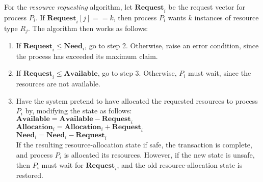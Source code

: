 For the \textit{resource requesting} algorithm, let $\mathbf{Request}_i$ be the request vector for process $P_i$.
If $\mathbf{Request}_i [j] == k$, then process $P_i$ wants $k$ instances of resource type $R_j$.
The algorithm then works as follows:
\begin{enumerate}
    \item If $\mathbf{Request}_i \le \mathbf{Need}_i$, go to step 2.
    Otherwise, raise an error condition, since the process has exceeded its maximum claim.
    \item If $\mathbf{Request}_i \le \mathbf{Available}$, go to step 3.
    Otherwise, $P_i$ must wait, since the resources are not available.
    \item Have the system pretend to have allocated the requested resources to process $P_i$ by,
    modifying the state as follows:\\
    $\mathbf{Available} = \mathbf{Available} - \mathbf{Request}_i$\\
    $\mathbf{Allocation}_i = \mathbf{Allocation}_i + \mathbf{Request}_i$\\
    $\mathbf{Need}_i = \mathbf{Need}_i - \mathbf{Request}_i$\\
    If the resulting resource-allocation state if safe,
    the transaction is complete, and process $P_i$ is allocated its resources.
    However, if the new state is unsafe, then $P_i$ must wait for $\mathbf{Request}_i$,
    and the old resource-allocation state is restored.
\end{enumerate}
